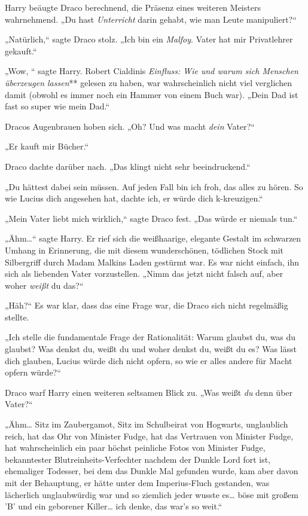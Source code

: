 {Harry beäugte Draco berechnend, die Präsenz eines weiteren Meisters wahrnehmend. „Du hast \emph{Unterricht} darin gehabt, wie man Leute manipuliert?“

„Natürlich,“ sagte Draco stolz. „Ich bin ein \emph{Malfoy}. Vater hat mir Privatlehrer gekauft.“

„Wow, “ sagte Harry. Robert Cialdinis \emph{Einfluss: Wie und warum sich Menschen überzeugen lassen}** gelesen zu haben, war wahrscheinlich nicht viel verglichen damit (obwohl es immer noch ein Hammer von einem Buch war). „Dein Dad ist fast so super wie mein Dad.“

Dracos Augenbrauen hoben sich. „Oh? Und was macht \emph{dein} Vater?“

„Er kauft mir Bücher.“

Draco dachte darüber nach. „Das klingt nicht sehr beeindruckend.“

„Du hättest dabei sein müssen. Auf jeden Fall bin ich froh, das alles zu hören. So wie Lucius dich angesehen hat, dachte ich, er würde dich k-kreuzigen.“

„Mein Vater liebt mich wirklich,“ sagte Draco fest. „Das würde er niemals tun.“

„Ähm…“ sagte Harry. Er rief sich die weißhaarige, elegante Gestalt im schwarzen Umhang in Erinnerung, die mit diesem wunderschönen, tödlichen Stock mit Silbergriff durch Madam Malkins Laden gestürmt war. Es war nicht einfach, ihn sich als liebenden Vater vorzustellen. „Nimm das jetzt nicht falsch auf, aber woher \emph{weißt} du das?“

„Häh?“ Es war klar, dass das eine Frage war, die Draco sich nicht regelmäßig stellte.

„Ich stelle die fundamentale Frage der Rationalität: Warum glaubst du, was du glaubst? Was denkst du, weißt du und woher denkst du, weißt du es? Was lässt dich glauben, Lucius würde dich nicht opfern, so wie er alles andere für Macht opfern würde?“

Draco warf Harry einen weiteren seltsamen Blick zu. „Was weißt \emph{du} denn über Vater?“

„Ähm… Sitz im Zaubergamot, Sitz im Schulbeirat von Hogwarts, unglaublich reich, hat das Ohr von Minister Fudge, hat das Vertrauen von Minister Fudge, hat wahrscheinlich ein paar höchst peinliche Fotos von Minister Fudge, bekanntester Blutreinheits-Verfechter nachdem der Dunkle Lord fort ist, ehemaliger Todesser, bei dem das Dunkle Mal gefunden wurde, kam aber davon mit der Behauptung, er hätte unter dem Imperius-Fluch gestanden, was lächerlich unglaubwürdig war und so ziemlich jeder wusste es… böse mit großem 'B' und ein geborener Killer… ich denke, das war's so weit.“

}
